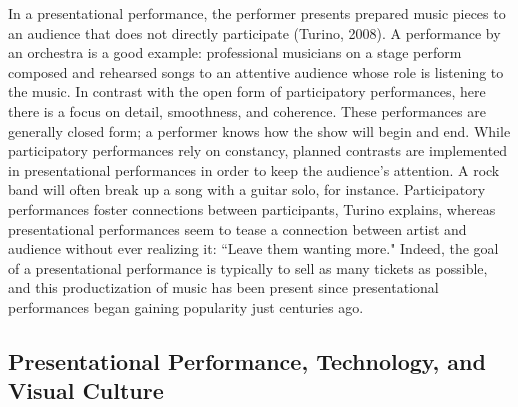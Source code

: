 In a presentational performance, the performer presents prepared music pieces to an audience that does not directly participate (Turino, 2008). A performance by an orchestra is a good example: professional musicians on a stage perform composed and rehearsed songs to an attentive audience whose role is listening to the music. In contrast with the open form of participatory performances, here there is a focus on detail, smoothness, and coherence. These performances are generally closed form; a performer knows how the show will begin and end. While participatory performances rely on constancy, planned contrasts are implemented in presentational performances in order to keep the audience's attention. A rock band will often break up a song with a guitar solo, for instance. Participatory performances foster connections between participants, Turino explains, whereas presentational performances seem to tease a connection between artist and audience without ever realizing it: ``Leave them wanting more." Indeed, the goal of a presentational performance is typically to sell as many tickets as possible, and this productization of music has been present since presentational performances began gaining popularity just centuries ago.

\subsection{Presentational Performance, Technology, and Visual Culture}

